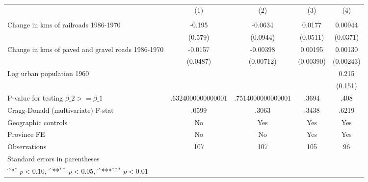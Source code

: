 {
\def\sym#1{\ifmmode^{#1}\else\(^{#1}\)\fi}
\begin{tabular}{l*{4}{c}}
\hline\hline
                &\multicolumn{1}{c}{(1)}&\multicolumn{1}{c}{(2)}&\multicolumn{1}{c}{(3)}&\multicolumn{1}{c}{(4)}\\
                &\multicolumn{1}{c}{}&\multicolumn{1}{c}{}&\multicolumn{1}{c}{}&\multicolumn{1}{c}{}\\
\hline
Change in kms of railroads 1986-1970&   -0.195         &  -0.0634         &   0.0177         &  0.00944         \\
                &  (0.579)         & (0.0944)         & (0.0511)         & (0.0371)         \\
[1em]
Change in kms of paved and gravel roads 1986-1970&  -0.0157         & -0.00398         &  0.00195         &  0.00130         \\
                & (0.0487)         &(0.00712)         &(0.00390)         &(0.00243)         \\
[1em]
Log urban population 1960&                  &                  &                  &    0.215         \\
                &                  &                  &                  &  (0.151)         \\
\hline
P-value for testing $\beta\_{2} >= \beta\_{1}$&.6324000000000001         &.7514000000000001         &    .3694         &     .408         \\
Cragg-Donald (multivariate) F-stat&    .0599         &    .3063         &    .3438         &    .6219         \\
Geographic controls&       No         &      Yes         &      Yes         &      Yes         \\
Province FE     &       No         &       No         &      Yes         &      Yes         \\
Observations    &      107         &      107         &      105         &       96         \\
\hline\hline
\multicolumn{5}{l}{\footnotesize Standard errors in parentheses}\\
\multicolumn{5}{l}{\footnotesize \sym{*} \(p<0.10\), \sym{**} \(p<0.05\), \sym{***} \(p<0.01\)}\\
\end{tabular}
}
